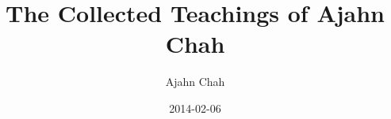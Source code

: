 \documentclass[
  final,
  pagePreset=largevolume,
  babelLanguage=british,
]{opus}
\title{The Collected Teachings of Ajahn Chah}
\subtitle{}
\author{Ajahn Chah}
\date{2014-02-06}
\newcommand{\volumeTitle}{}
\begin{document}


\frontmatter

\emptysheet






\cleartorecto
\tableofcontents









\mainmatter



\backmatter


% 

%
%

%
%
%
%
%



\emptysheet
\end{document}
